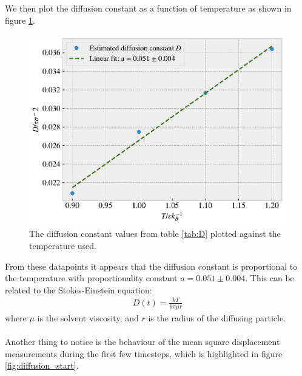 \documentclass[reprint, amsmath, amssymb, aps]{revtex4-2}
\begin{document}
We then plot the diffusion constant as a function of temperature as shown in figure \ref{fig:diffusion_relation}.
\begin{figure}[H]
  \includegraphics[width=\linewidth]{figures/diffusion_relation.pdf}
  \caption{The diffusion constant values from table \ref{tab:D} plotted against the temperature used.}
  \label{fig:diffusion_relation}
\end{figure}

From these datapoints it appears that the diffusion constant is proportional to the temperature with proportionality constant $a = 0.051 \pm 0.004$. This can be related to the Stokes-Einstein equation:
\begin{align*}
  D(t) = \frac{kT}{6\pi \mu r}
\end{align*}
where $\mu$ is the solvent viscosity, and $r$ is the radius of the diffusing particle. \\
\\
Another thing to notice is the behaviour of the mean square displacement measurements during the first few timesteps, which is highlighted in figure \ref{fig:diffusion_start}.
\end{document}
